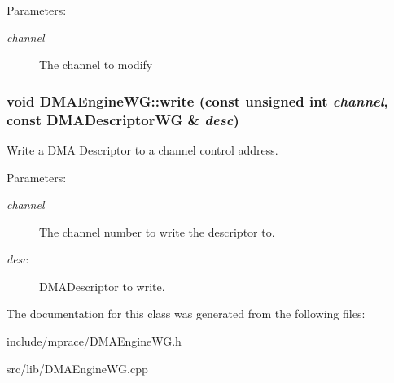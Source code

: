 \begin{Desc}
\item[Parameters:]
\begin{description}
\item[{\em channel}]The channel to modify\end{description}
\end{Desc}
\hypertarget{classmprace_1_1DMAEngineWG_b0}{
\subsubsection[write]{\setlength{\rightskip}{0pt plus 5cm}void DMAEngine\-WG::write (const unsigned int {\em channel}, const DMADescriptor\-WG \& {\em desc})}}
\label{classmprace_1_1DMAEngineWG_b0}


Write a DMA Descriptor to a channel control address. 

\begin{Desc}
\item[Parameters:]
\begin{description}
\item[{\em channel}]The channel number to write the descriptor to. \item[{\em desc}]DMADescriptor to write.\end{description}
\end{Desc}


The documentation for this class was generated from the following files:\begin{CompactItemize}
\item 
include/mprace/DMAEngine\-WG.h\item 
src/lib/DMAEngine\-WG.cpp\end{CompactItemize}
